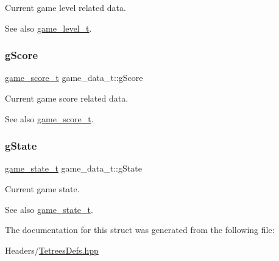 Current game level related data. \begin{DoxySeeAlso}{See also}
\hyperlink{structgame__level__t}{game\+\_\+level\+\_\+t}. 
\end{DoxySeeAlso}
\mbox{\label{structgame__data__t_a70e04b66160685cc84bcdd30edb97e46}} 
\subsubsection{\texorpdfstring{g\+Score}{gScore}}
{\footnotesize\ttfamily \hyperlink{structgame__score__t}{game\+\_\+score\+\_\+t} game\+\_\+data\+\_\+t\+::g\+Score}

Current game score related data. \begin{DoxySeeAlso}{See also}
\hyperlink{structgame__score__t}{game\+\_\+score\+\_\+t}. 
\end{DoxySeeAlso}
\mbox{\label{structgame__data__t_a48253f7b6212e0ff99d5d5960b79476d}} 
\subsubsection{\texorpdfstring{g\+State}{gState}}
{\footnotesize\ttfamily \hyperlink{TetreesDefs_8hpp_aebae08b2e3a36f1452b33acaf1eaab40}{game\+\_\+state\+\_\+t} game\+\_\+data\+\_\+t\+::g\+State}

Current game state. \begin{DoxySeeAlso}{See also}
\hyperlink{TetreesDefs_8hpp_aebae08b2e3a36f1452b33acaf1eaab40}{game\+\_\+state\+\_\+t}. 
\end{DoxySeeAlso}


The documentation for this struct was generated from the following file\+:\begin{DoxyCompactItemize}
\item 
Headers/\hyperlink{TetreesDefs_8hpp}{Tetrees\+Defs.\+hpp}\end{DoxyCompactItemize}
